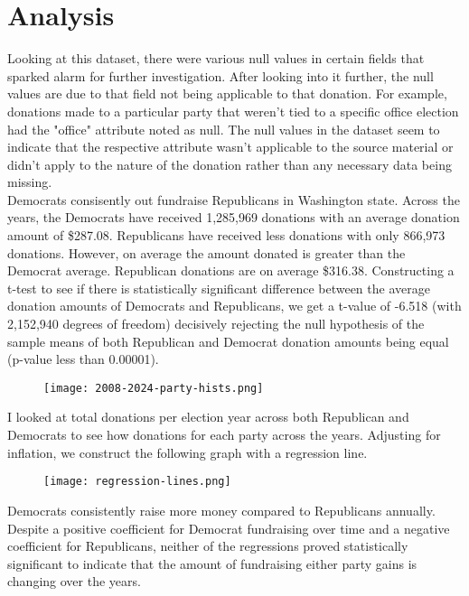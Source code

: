 \documentclass[9pt, compsoc, technote, a4paper]{IEEEtran}
\begin{document}
\section{Analysis}
Looking at this dataset, there were various null values in certain fields that sparked alarm for further investigation. After looking into it further, the null values are due to that field not being applicable to that donation. For example, donations made to a particular party that weren't tied to a specific office election had the "office" attribute noted as null. The null values in the dataset seem to indicate that the respective attribute wasn't applicable to the source material or didn't apply to the nature of the donation rather than any necessary data being missing.
\\
Democrats consisently out fundraise Republicans in Washington state. Across the years, the Democrats have received 1,285,969 donations with an average donation amount of \$287.08. Republicans have received less donations with only 866,973 donations. However, on average the amount donated is greater than the Democrat average. Republican donations are on average \$316.38. Constructing a t-test to see if there is statistically significant difference between the average donation amounts of Democrats and Republicans, we get a t-value of -6.518 (with 2,152,940 degrees of freedom) decisively rejecting the null hypothesis of the sample means of both Republican and Democrat donation amounts being equal (p-value less than 0.00001).

\begin{figure}[H]
    \texttt{[image: 2008-2024-party-hists.png]}
\end{figure}
I looked at total donations per election year across both Republican and Democrats to see how donations for each party across the years. Adjusting for inflation, we construct the following graph with a regression line.
\begin{figure}[H]
    \begin{center}
        \texttt{[image: regression-lines.png]}
    \end{center}
\end{figure}
Democrats consistently raise more money compared to Republicans annually. Despite a positive coefficient for Democrat fundraising over time and a negative coefficient for Republicans, neither of the regressions proved statistically significant to indicate that the amount of fundraising either party gains is changing over the years.\\
\end{document}
